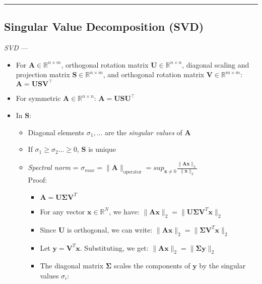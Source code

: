 {\color{black}\hrule height 0.001mm}

\subsection*{Singular Value Decomposition (SVD)}
\emph{SVD} --- 
\begin{itemize}
    \item For $\boldsymbol{A} \in \mathbb{R}^{n \times m}$, orthogonal rotation matrix $\boldsymbol{U} \in \mathbb{R}^{n \times n}$, diagonal scaling and projection matrix $\boldsymbol{S} \in \mathbb{R}^{n \times m}$, and orthogonal rotation matrix $\boldsymbol{V} \in \mathbb{R}^{m \times m}$: $\boldsymbol{A} = \boldsymbol{U} \boldsymbol{S} \boldsymbol{V}^\intercal$
    \item For symmetric $\boldsymbol{A} \in \mathbb{R}^{n \times n}$: $\boldsymbol{A} = \boldsymbol{U} \boldsymbol{S} \boldsymbol{U}^\intercal$
    \item In $\boldsymbol{S}$:
    \begin{itemize}
        \item Diagonal elements $\sigma_1, ...$ are the \emph{singular values} of $\boldsymbol{A}$
        \item If $\sigma_1 \geq \sigma_2 ... \geq 0$, $\boldsymbol{S}$ is unique
        \item \emph{Spectral norm} = $\sigma_{max} = \| \boldsymbol{A} \|_{\textrm{operator}} = sup_{\boldsymbol{x} \neq 0} \frac{\|\boldsymbol{A}\boldsymbol{x}\|_2}{\|\boldsymbol{x}\|_2}$\\
        Proof:
        \begin{itemize}
            \item $\boldsymbol{A} = \boldsymbol{U} \boldsymbol{\Sigma} \boldsymbol{V}^T$
            \item For any vector $\boldsymbol{x} \in \mathbb{R}^N$, we have:
            $\|\boldsymbol{A}\boldsymbol{x}\|_2 = \|\boldsymbol{U} \boldsymbol{\Sigma} \boldsymbol{V}^T \boldsymbol{x}\|_2$
            \item Since $\boldsymbol{U}$ is orthogonal, we can write:
            $\|\boldsymbol{A}\boldsymbol{x}\|_2 = \|\boldsymbol{\Sigma} \boldsymbol{V}^T \boldsymbol{x}\|_2$
            \item Let $\boldsymbol{y} = \boldsymbol{V}^T \boldsymbol{x}$. Substituting, we get:
            $\|\boldsymbol{A}\boldsymbol{x}\|_2 = \|\boldsymbol{\Sigma} \boldsymbol{y}\|_2$ 
            \item The diagonal matrix $\boldsymbol{\Sigma}$ scales the components of $\boldsymbol{y}$ by the singular values $\sigma_i$:

\end{itemize}
\end{itemize}
\end{itemize}
